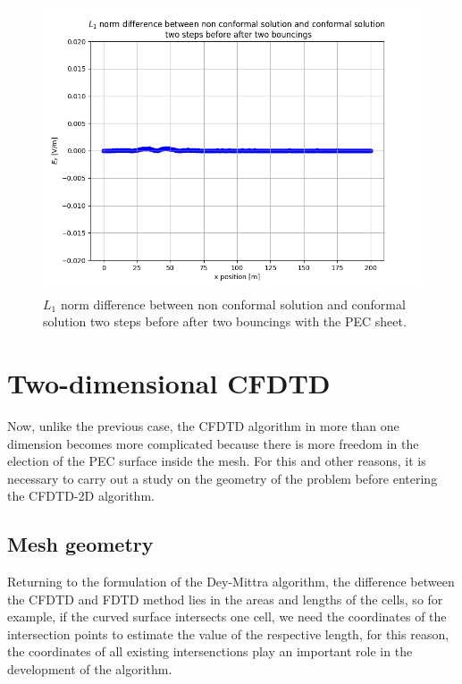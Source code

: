 \documentclass[12pt, oneside]{book}
\begin{document}
\begin{figure}[h!]
    \centering
    \includegraphics[scale=0.6]{Imagenes/CFDTD1D_DelayNorm.png}
    \caption{$L_1$ norm difference between non conformal solution and conformal solution two steps before after two bouncings with the PEC sheet.}
    \label{fig:CFDTD1D_DelayNorm}
\end{figure}
\newpage
\section{Two-dimensional CFDTD}

Now, unlike the previous case, the CFDTD algorithm in more than one dimension becomes more complicated because there is more freedom in the election of the PEC surface inside the mesh. For this and other reasons, it is necessary to carry out a study on the geometry of the problem before entering the CFDTD-2D algorithm.

\subsection{Mesh geometry}

Returning to the formulation of the Dey-Mittra algorithm, the difference between the CFDTD and FDTD method lies in the areas and lengths of the cells, so for example, if the curved surface intersects one cell, we need the coordinates of the intersection points to estimate the value of the respective length, for this reason, the coordinates of all existing intersenctions play an important role in the development of the algorithm.
\end{document}

